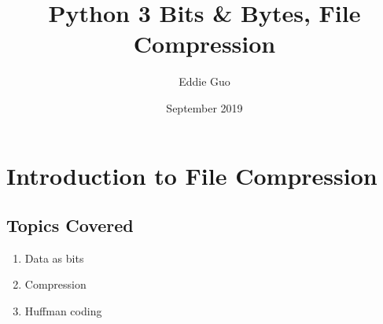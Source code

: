 \documentclass{article}
\title{Python 3 Bits \& Bytes, File Compression}
\author{Eddie Guo}
\date{September 2019}
\begin{document}
\lstset{language=Python}
\maketitle

\section{Introduction to File Compression}
\subsection{Topics Covered}
    \begin{multicols}{3}
        \begin{enumerate}[label=(\roman*)]
            \item Data as bits
            \item Compression
            \item Huffman coding
        \end{enumerate}
    \end{multicols}

\end{document}
